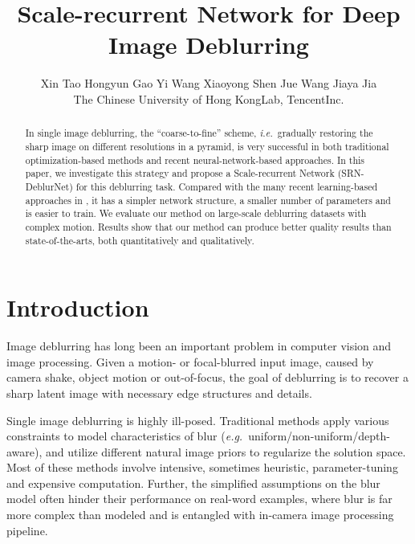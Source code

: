 \documentclass[10pt,twocolumn,letterpaper]{article}
\def\eg{\emph{e.g.}} \def\Eg{\emph{E.g}.} \def\ie{\emph{i.e.}}
\begin{document}
\title{Scale-recurrent Network for Deep Image Deblurring}

\author{Xin Tao \quad Hongyun Gao \quad Yi Wang \quad Xiaoyong Shen 
\quad Jue Wang \quad Jiaya Jia\\
The Chinese University of Hong Kong\quadYoutu Lab, Tencent\quadMegvii Inc.\\
}


\maketitle


\begin{abstract}
  In single image deblurring, the ``coarse-to-fine'' scheme, \ie~gradually restoring the sharp image on different resolutions in a pyramid, is very successful in both traditional optimization-based methods and recent neural-network-based approaches. In this paper, we investigate this strategy and propose a Scale-recurrent Network (SRN-DeblurNet) for this deblurring task. 
  Compared with the many recent learning-based approaches in \cite{nah2017deep}, it has a simpler network structure, a smaller number of parameters and is easier to train.
  We evaluate our method on large-scale deblurring datasets with complex motion. Results show that our method can produce better quality results than state-of-the-arts, both quantitatively and qualitatively.
\end{abstract}

\section{Introduction} \label{sec:intro}
Image deblurring has long been an important problem in computer vision and image
processing. Given a motion- or focal-blurred input image, caused by camera shake, object motion or out-of-focus, the goal of deblurring is to recover a sharp latent image with necessary edge structures and details.

Single image deblurring is highly ill-posed. Traditional methods apply various constraints to model characteristics of blur (\eg~uniform/non-uniform/depth-aware), and utilize different natural image priors \cite{bahat2017non,chan1998total,cho2009fast,goldstein2012blur,pan2014deblurring,xu2010two,xu2013unnatural}
to regularize the solution space. Most of these methods involve intensive, sometimes heuristic, parameter-tuning and expensive computation. Further, the simplified assumptions on the blur model often hinder their performance on real-word examples, where blur is far more complex than modeled and is entangled with in-camera image processing pipeline.
\end{document}
